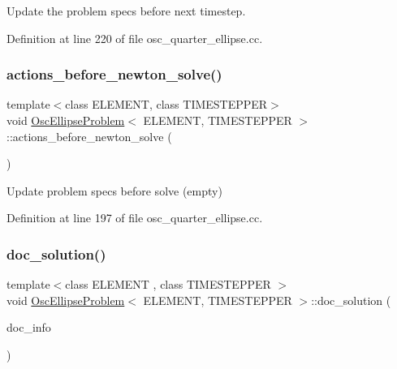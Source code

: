 Update the problem specs before next timestep. 



Definition at line 220 of file osc\+\_\+quarter\+\_\+ellipse.\+cc.

\mbox{\label{classOscEllipseProblem_a18bbd70aa8c140637637053a5f839c11}} 
\subsubsection{\texorpdfstring{actions\+\_\+before\+\_\+newton\+\_\+solve()}{actions\_before\_newton\_solve()}}
{\footnotesize\ttfamily template$<$class E\+L\+E\+M\+E\+NT, class T\+I\+M\+E\+S\+T\+E\+P\+P\+ER$>$ \\
void \hyperlink{classOscEllipseProblem}{Osc\+Ellipse\+Problem}$<$ E\+L\+E\+M\+E\+NT, T\+I\+M\+E\+S\+T\+E\+P\+P\+ER $>$\+::actions\+\_\+before\+\_\+newton\+\_\+solve (\begin{DoxyParamCaption}{ }\end{DoxyParamCaption})\hspace{0.3cm}{\ttfamily [inline]}}



Update problem specs before solve (empty) 



Definition at line 197 of file osc\+\_\+quarter\+\_\+ellipse.\+cc.

\mbox{\label{classOscEllipseProblem_afca2cc3e3e64ac764323f232cacc7e3b}} 
\subsubsection{\texorpdfstring{doc\+\_\+solution()}{doc\_solution()}}
{\footnotesize\ttfamily template$<$class E\+L\+E\+M\+E\+NT , class T\+I\+M\+E\+S\+T\+E\+P\+P\+ER $>$ \\
void \hyperlink{classOscEllipseProblem}{Osc\+Ellipse\+Problem}$<$ E\+L\+E\+M\+E\+NT, T\+I\+M\+E\+S\+T\+E\+P\+P\+ER $>$\+::doc\+\_\+solution (\begin{DoxyParamCaption}\item[{Doc\+Info \&}]{doc\+\_\+info }\end{DoxyParamCaption})}



